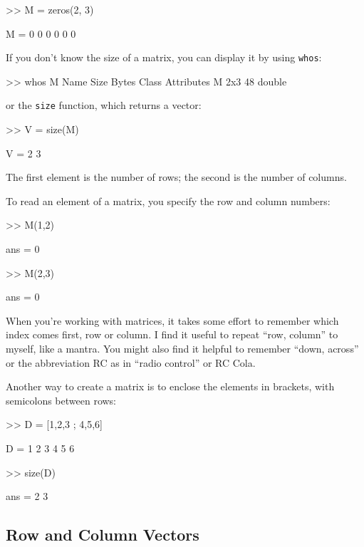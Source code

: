 \documentclass[../../book.tex]{subfiles}
\begin{document}
\begin{code}
>> M = zeros(2, 3)

M =  0     0     0
     0     0     0
\end{code}

If you don't know the size of a matrix, you can display it by using \lstinline{whos}:

\begin{code}
>> whos M
  Name      Size            Bytes  Class     Attributes
  M         2x3                48  double
\end{code}
or the \lstinline{size} function, which returns a vector:


\begin{code}
>> V = size(M)

V = 2    3
\end{code}

The first element is the number of rows; the second is the number of
columns.


To read an element of a matrix, you specify the row and column \mbox{numbers}:

\begin{code}
>> M(1,2)

ans = 0

>> M(2,3)

ans = 0
\end{code}

When you're working with matrices, it takes some effort to remember
which index comes first, row or column.  I find it useful to repeat
``row, column'' to myself, like a mantra.  You might also find it
helpful to remember ``down, across'' or the abbreviation RC as in ``radio control'' or RC Cola.

Another way to create a matrix is to enclose the elements in
brackets, with semicolons between rows:

\begin{code}
>> D = [1,2,3 ; 4,5,6]

D =  1     2     3
     4     5     6

>> size(D)

ans = 2     3
\end{code}


\subsection{Row and Column Vectors}
\label{rowvector}
\end{document}
